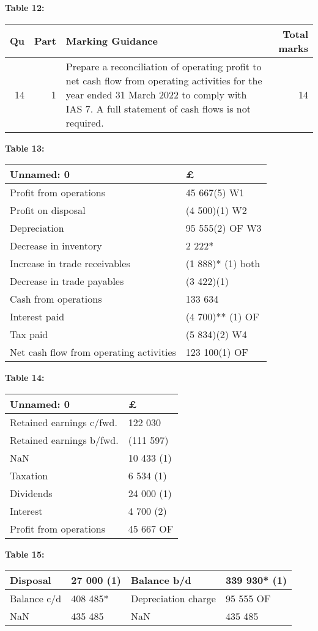 \documentclass{article}
\begin{document}
\textbf{Table 12:}
\begin{tabular}{rrlr}
\toprule
Qu & Part & Marking Guidance & Total
marks \\
\midrule
14 & 1 & Prepare a reconciliation of operating profit to net cash flow from operating
activities for the year ended 31 March 2022 to comply with IAS 7.
A full statement of cash flows is not required. & 14 \\
\bottomrule
\end{tabular}

\textbf{Table 13:}
\begin{tabular}{ll}
\toprule
Unnamed: 0 & £ \\
\midrule
Profit from operations & 45 667(5) W1 \\
Profit on disposal & (4 500)(1) W2 \\
Depreciation & 95 555(2) OF W3 \\
Decrease in inventory & 2 222* \\
Increase in trade receivables & (1 888)* (1) both \\
Decrease in trade payables & (3 422)(1) \\
Cash from operations & 133 634 \\
Interest paid & (4 700)** (1) OF \\
Tax paid & (5 834)(2) W4 \\
Net cash flow from operating activities & 123 100(1) OF \\
\bottomrule
\end{tabular}

\textbf{Table 14:}
\begin{tabular}{ll}
\toprule
Unnamed: 0 & £ \\
\midrule
Retained earnings c/fwd. & 122 030 \\
Retained earnings b/fwd. & (111 597) \\
NaN & 10 433 (1) \\
Taxation & 6 534 (1) \\
Dividends & 24 000 (1) \\
Interest & 4 700 (2) \\
Profit from operations & 45 667 OF \\
\bottomrule
\end{tabular}

\textbf{Table 15:}
\begin{tabular}{llll}
\toprule
Disposal & 27 000 (1) & Balance b/d & 339 930* (1) \\
\midrule
Balance c/d & 408 485* & Depreciation charge & 95 555 OF \\
NaN & 435 485 & NaN & 435 485 \\
\bottomrule
\end{tabular}
\end{document}
